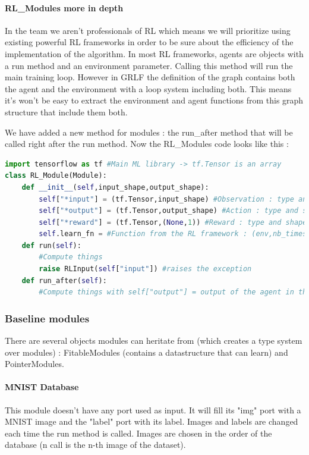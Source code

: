 \documentclass[11pt]{article}
\begin{document}
\paragraph{RL\_Modules more in depth}
In the team we aren't professionals of RL which means we will prioritize using existing powerful RL frameworks in order to be sure about the efficiency of the implementation of the algorithm. In most RL frameworks, agents are objects with a run method and an environment parameter. Calling this method will run the main training loop. However in GRLF the definition of the graph contains both the agent and the environment with a loop system including both. This means it's won't be easy to extract the environment and agent functions from this graph structure that include them both.

We have added a new method for modules : the run\_after method that will be called right after the run method. Now the RL\_Modules code looks like this :
\begin{lstlisting}[language=Python]
import tensorflow as tf #Main ML library -> tf.Tensor is an array
class RL_Module(Module):
	def __init__(self,input_shape,output_shape):
		self["*input"] = (tf.Tensor,input_shape) #Observation : type and shape
		self["*output"] = (tf.Tensor,output_shape) #Action : type and shape
		self["*reward"] = (tf.Tensor,(None,1)) #Reward : type and shape
		self.learn_fn = #Function from the RL framework : (env,nb_timesteps) -> object
	def run(self):
		#Compute things
		raise RLInput(self["input"]) #raises the exception
	def run_after(self):
		#Compute things with self["output"] = output of the agent in the RL framework
\end{lstlisting}

\subsubsection{Baseline modules}
There are several objects modules can heritate from (which creates a type system over modules) : FitableModules (contains a datastructure that can learn) and PointerModules.
\paragraph{MNIST Database}
This module doesn't have any port used as input. It will fill its "img" port with a MNIST image and the "label" port with its label. Images and labels are changed each time the run method is called. Images are chosen in the order of the database (n call is the n-th image of the dataset).
\end{document}
